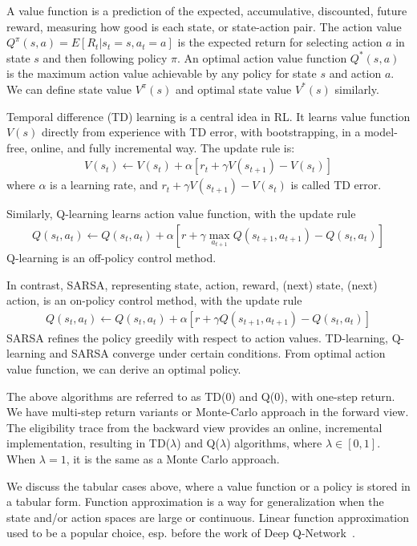 A value function is a prediction of the expected, accumulative, discounted, future reward, measuring how good is each state, or state-action pair. The action value $Q^{\pi}(s, a) = E[R_t | s_t = s, a_t = a]$ is the expected return for selecting action $a$ in state $s$ and then following policy $\pi$. An optimal action value function $Q^{*}(s, a)$ is the maximum action value achievable by any policy for state $s$ and action $a$. We can define state value $V^{\pi}(s)$ and optimal state value $V^{*}(s)$ similarly.

Temporal difference (TD) learning is a central idea in RL. It learns value function $V(s)$ directly from experience with TD error, with bootstrapping, in a model-free, online, and fully incremental way. 
The update rule is:
\begin{align*}
 V(s_t) \leftarrow V(s_t) + \alpha [r_t + \gamma V(s_{t+1}) - V(s_t)]   
\end{align*}
where $\alpha$ is a learning rate, and $r_t + \gamma V(s_{t+1}) - V(s_t)$ is called TD error.

Similarly, Q-learning learns action value function, with the update rule
\begin{align*}
 Q(s_t, a_t) \leftarrow Q(s_t, a_t) + \alpha [r + \gamma \max_{a_{t+1}}Q(s_{t+1}, a_{t+1}) - Q(s_t,a_t)]   
\end{align*}
Q-learning is an off-policy control method.

In contrast, SARSA, representing state, action, reward, (next) state, (next) action, is an on-policy control method, with the update rule
\begin{align*}
    Q(s_t, a_t) \leftarrow Q(s_t, a_t) + \alpha [r + \gamma Q(s_{t+1}, a_{t+1}) - Q(s_t,a_t)]
\end{align*}
SARSA refines the policy greedily with respect to action values. TD-learning, Q-learning and SARSA converge under certain conditions. From optimal action value function, we can derive an optimal policy. 

The above algorithms are referred to as TD(0) and Q(0), with one-step return. We have multi-step return variants or Monte-Carlo approach in the forward view. The eligibility trace from the backward view provides an online, incremental implementation, resulting in TD($\lambda$) and Q($\lambda$) algorithms, where $\lambda \in[0,1]$. When $\lambda = 1$, it is the same as a Monte Carlo approach. 

We discuss the tabular cases above, where a value function or a policy is stored in a tabular form. Function approximation is a way for generalization when the state and/or action spaces are large or continuous. Linear function approximation used to be a popular choice, esp. before the work of Deep Q-Network~\citep{Atari}.

